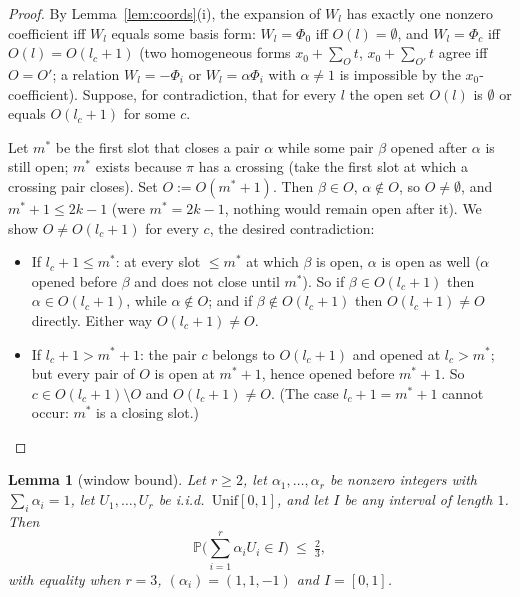 ﻿\documentclass[11pt]{article}
\newtheorem{lemma}[theorem]{Lemma}
\theoremstyle{remark}
\begin{document}
\begin{proof}
By Lemma~\ref{lem:coords}(i), the expansion of $W_l$ has exactly one nonzero
coefficient iff $W_l$ equals some basis form: $W_l=\Phi_0$ iff $O(l)=\emptyset$, and
$W_l=\Phi_c$ iff $O(l)=O(l_c+1)$ (two homogeneous forms $x_0+\sum_{O}t$,
$x_0+\sum_{O'}t$ agree iff $O=O'$; a relation $W_l=-\Phi_i$ or
$W_l=\alpha\Phi_i$ with $\alpha\neq1$ is impossible by the $x_0$-coefficient).
Suppose, for contradiction, that for every $l$ the open set $O(l)$ is $\emptyset$ or
equals $O(l_c+1)$ for some $c$.

Let $m^*$ be the first slot that closes a pair $\alpha$ while some pair $\beta$
opened after $\alpha$ is still open; $m^*$ exists because $\pi$ has a crossing
(take the first slot at which a crossing pair closes). Set $O:=O(m^*+1)$. Then
$\beta\in O$, $\alpha\notin O$, so $O\neq\emptyset$, and $m^*+1\le 2k-1$ (were
$m^*=2k-1$, nothing would remain open after it). We show $O\neq O(l_c+1)$ for every
$c$, the desired contradiction:
\begin{itemize}
\item If $l_c+1\le m^*$: at every slot $\le m^*$ at which $\beta$ is open, $\alpha$
is open as well ($\alpha$ opened before $\beta$ and does not close until $m^*$). So
if $\beta\in O(l_c+1)$ then $\alpha\in O(l_c+1)$, while $\alpha\notin O$; and if
$\beta\notin O(l_c+1)$ then $O(l_c+1)\ne O$ directly. Either way $O(l_c+1)\neq O$.
\item If $l_c+1>m^*+1$: the pair $c$ belongs to $O(l_c+1)$ and opened at
$l_c>m^*$; but every pair of $O$ is open at $m^*+1$, hence opened before $m^*+1$.
So $c\in O(l_c+1)\setminus O$ and $O(l_c+1)\neq O$. (The case $l_c+1=m^*+1$ cannot
occur: $m^*$ is a closing slot.)
\end{itemize}
\end{proof}

\begin{lemma}[window bound]\label{lem:window}
Let $r\ge2$, let $\alpha_1,\dots,\alpha_r$ be nonzero integers with
$\sum_i\alpha_i=1$, let $U_1,\dots,U_r$ be i.i.d.\ $\mathrm{Unif}[0,1]$, and let
$I$ be any interval of length $1$. Then
\[
\mathbb{P}\Big(\sum_{i=1}^r\alpha_iU_i\in I\Big)\ \le\ \tfrac23 ,
\]
with equality when $r=3$, $(\alpha_i)=(1,1,-1)$ and $I=[0,1]$.
\end{lemma}
\end{document}
